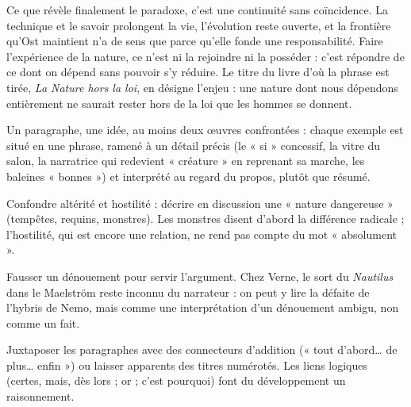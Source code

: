 \documentclass[11pt,a4paper]{article}
\begin{document}
Ce que révèle finalement le paradoxe, c'est une continuité sans coïncidence. La technique et le savoir prolongent la vie, l'évolution reste ouverte, et la frontière qu'Ost maintient n'a de sens que parce qu'elle fonde une responsabilité. Faire l'expérience de la nature, ce n'est ni la rejoindre ni la posséder : c'est répondre de ce dont on dépend sans pouvoir s'y réduire. Le titre du livre d'où la phrase est tirée, \emph{La Nature hors la loi}, en désigne l'enjeu : une nature dont nous dépendons entièrement ne saurait rester hors de la loi que les hommes se donnent.

\begin{methode}

Un paragraphe, une idée, au moins deux œuvres confrontées : chaque exemple est situé en une phrase, ramené à un détail précis (le « si » concessif, la vitre du salon, la narratrice qui redevient « créature » en reprenant sa marche, les baleines « bonnes ») et interprété au regard du propos, plutôt que résumé.

\end{methode}

\begin{piege}

Confondre altérité et hostilité : décrire en discussion une « nature dangereuse » (tempêtes, requins, monstres). Les monstres disent d'abord la différence radicale ; l'hostilité, qui est encore une relation, ne rend pas compte du mot « absolument ».

\end{piege}

\begin{piege}

Fausser un dénouement pour servir l'argument. Chez Verne, le sort du \emph{Nautilus} dans le Maelström reste inconnu du narrateur : on peut y lire la défaite de l'hybris de Nemo, mais comme une interprétation d'un dénouement ambigu, non comme un fait.

\end{piege}

\begin{piege}

Juxtaposer les paragraphes avec des connecteurs d'addition (« tout d'abord\ldots{} de plus\ldots{} enfin ») ou laisser apparents des titres numérotés. Les liens logiques (certes, mais, dès lors ; or ; c'est pourquoi) font du développement un raisonnement.

\end{piege}
\end{document}
